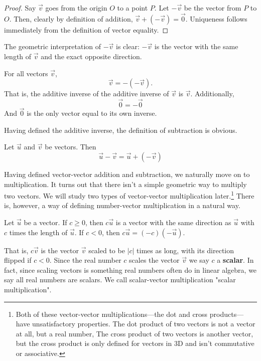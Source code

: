 \begin{proof}
	Say $\vec{v}$ goes from the origin $O$ to a point $P$. Let $-\vec{v}$ be the vector from $P$ to $O$. Then, clearly by definition of addition, $\vec{v} + (-\vec{v}) = \vec{0}$. Uniqueness follows immediately from the definition of vector equality.
\end{proof}

The geometric interpretation of $-\vec{v}$ is clear: $-\vec{v}$ is the vector with the same length of $\vec{v}$ and the exact opposite direction.

\begin{proposition}
	For all vectors $\vec{v}$,
	$$
	\vec{v} = -(-\vec{v}).
	$$
	That is, the additive inverse of the additive inverse of $\vec{v}$ is $\vec{v}$. Additionally, 
	$$
	\vec{0} = -\vec{0}
	$$
	And $\vec{0}$ is the only vector equal to its own inverse.
\end{proposition}

Having defined the additive inverse, the definition of subtraction is obvious.

\begin{definition}
	Let $\vec{u}$ and $\vec{v}$ be vectors. Then
	$$\vec{u} - \vec{v} = \vec{u} + (-\vec{v})$$
\end{definition}

Having defined vector-vector addition and subtraction, we naturally move on to multiplication. It turns out that there isn't a simple geometric way to multiply two vectors. We will study two types of vector-vector multiplication later.\footnote{Both of these vector-vector multiplications---the dot and cross products---have unsatisfactory properties. The dot product of two vectors is not a vector at all, but a real number, The cross product of two vectors is another vector, but the cross product is only defined for vectors in 3D and isn't commutative or associative.} There is, however, a way of defining number-vector multiplication in a natural way.

\begin{definition}
	Let $\vec{u}$ be a vector. If $c \ge 0$, then $c\vec{u}$ is a vector with the same direction as $\vec{u}$ with $c$ times the length of $\vec{u}$. If $c < 0$, then $c\vec{u} = (-c)(-\vec{u})$.
\end{definition}

That is, $c\vec{v}$ is the vector $\vec{v}$ scaled to be $|c|$ times as long, with its direction flipped if $c < 0$. Since the real number $c$ scales the vector $\vec{v}$ we say $c$ a \textbf{scalar}. In fact, since scaling vectors is something real numbers often do in linear algebra, we say all real numbers are scalars. We call scalar-vector multiplication "scalar multiplication". 

